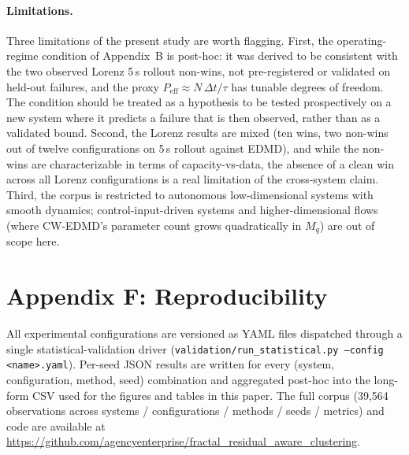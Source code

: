 \documentclass{article}
\begin{document}
\paragraph{Limitations.} Three limitations of the present study are worth flagging. First, the operating-regime condition of Appendix~B is post-hoc: it was derived to be consistent with the two observed Lorenz 5\,s rollout non-wins, not pre-registered or validated on held-out failures, and the proxy $P_{\text{eff}} \approx N\,\Delta t/\tau$ has tunable degrees of freedom. The condition should be treated as a hypothesis to be tested prospectively on a new system where it predicts a failure that is then observed, rather than as a validated bound. Second, the Lorenz results are mixed (ten wins, two non-wins out of twelve configurations on 5\,s rollout against EDMD), and while the non-wins are characterizable in terms of capacity-vs-data, the absence of a clean win across all Lorenz configurations is a real limitation of the cross-system claim. Third, the corpus is restricted to autonomous low-dimensional systems with smooth dynamics; control-input-driven systems and higher-dimensional flows (where CW-EDMD's parameter count grows quadratically in $M_q$) are out of scope here.

\section*{Appendix F: Reproducibility}

All experimental configurations are versioned as YAML files dispatched through a single statistical-validation driver (\texttt{validation/run\_statistical.py --config <name>.yaml}). Per-seed JSON results are written for every (system, configuration, method, seed) combination and aggregated post-hoc into the long-form CSV used for the figures and tables in this paper. The full corpus (39{,}564 observations across systems / configurations / methods / seeds / metrics) and code are available at \url{https://github.com/agencyenterprise/fractal_residual_aware_clustering}.
\end{document}
